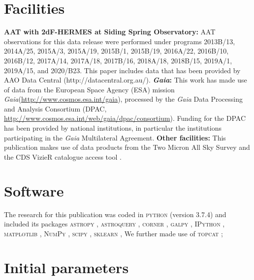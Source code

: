 \documentclass[
  journal=pasa,
  manuscript=research-paper, %
  year=2023,
  volume=37
]{cup-journal}
\newcommand{\Gaia}{\textit{Gaia}\xspace}
\begin{document}
\section*{Facilities}

\textbf{AAT with 2dF-HERMES at Siding Spring Observatory:}
AAT observations for this data release were performed under programs {2013B/13}, {2014A/25}, {2015A/3}, {2015A/19}, {2015B/1}, {2015B/19}, {2016A/22}, {2016B/10}, {2016B/12}, {2017A/14}, {2017A/18}, {2017B/16}, {2018A/18}, {2018B/15}, {2019A/1}, {2019A/15}, and {2020/B23}. This paper includes data that has been provided by AAO Data Central (http://datacentral.org.au/).
\textbf{\Gaia: } This work has made use of data from the European Space Agency (ESA) mission \Gaia (\url{http://www.cosmos.esa.int/gaia}), processed by the \Gaia Data Processing and Analysis Consortium (DPAC, \url{http://www.cosmos.esa.int/web/gaia/dpac/consortium}). Funding for the DPAC has been provided by national institutions, in particular the institutions participating in the \Gaia Multilateral Agreement. 
\textbf{Other facilities:} This publication makes use of data products from the Two Micron All Sky Survey \citep{Skrutskie2006} and the CDS VizieR catalogue access tool \citep{Vizier2000}.

\section*{Software}

The research for this publication was coded in \textsc{python} (version 3.7.4) and included its packages
\textsc{astropy} \citep[v. 3.2.2;][]{Robitaille2013,PriceWhelan2018},
\textsc{astroquery} \citep[v. 0.4;][]{Ginsburg2019},
\textsc{corner} \citep[v. 2.0.1;][]{corner},
\textsc{galpy} \citep[version 1.6.0;][]{Bovy2015},
\textsc{IPython} \citep[v. 7.8.0;][]{ipython},
\textsc{matplotlib} \citep[v. 3.1.3;][]{matplotlib},
\textsc{NumPy} \citep[v. 1.17.2;][]{numpy},
\textsc{scipy} \citep[version 1.3.1;][]{scipy},
\textsc{sklearn} \citep[v. 0.21.3;][]{scikit-learn},
We further made use of \textsc{topcat} \citep[version 4.7;][]{Taylor2005};




\appendix

\section{Initial parameters}
\end{document}
